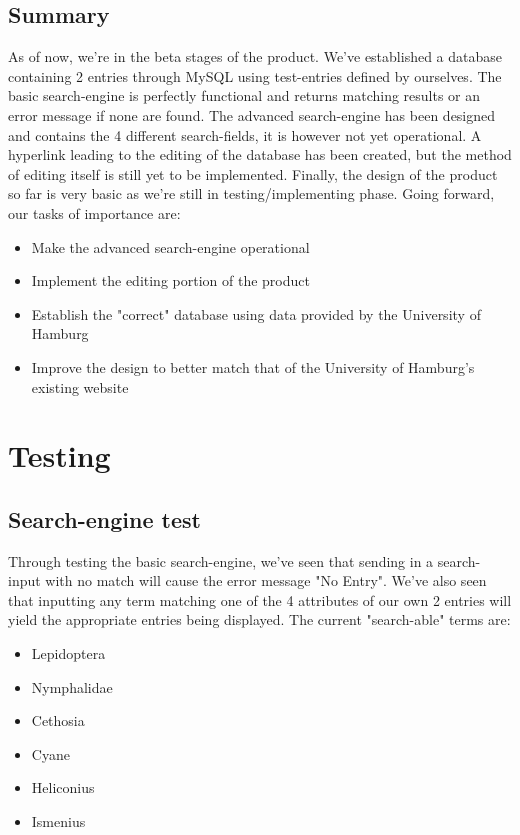\documentclass[12pt,a4paper]{article}
\begin{document}
\subsection{Summary}

As of now, we're in the beta stages of the product. We've established a database containing 2 entries through MySQL using test-entries defined by ourselves. 
The basic search-engine is perfectly functional and returns matching results or an error message if none are found.
The advanced search-engine has been designed and contains the 4 different search-fields, it is however not yet operational.
A hyperlink leading to the editing of the database has been created, but the method of editing itself is still yet to be implemented.
Finally, the design of the product so far is very basic as we're still in testing/implementing phase.
Going forward, our tasks of importance are:
\begin{itemize}
\item Make the advanced search-engine operational
\item Implement the editing portion of the product
\item Establish the "correct" database using data provided by the University of Hamburg
\item Improve the design to better match that of the University of Hamburg's existing website
\end{itemize}

\section{Testing}
\subsection{Search-engine test}

Through testing the basic search-engine, we've seen that sending in a search-input with no match will cause the error message "No Entry".
We've also seen that inputting any term matching one of the 4 attributes of our own 2 entries will yield the appropriate entries being displayed. 
The current "search-able" terms are:
\begin{itemize}
	\item Lepidoptera
	\item Nymphalidae
	\item Cethosia
	\item Cyane 
	\item Heliconius
	\item Ismenius
\end{itemize}
\newpage
\end{document}
